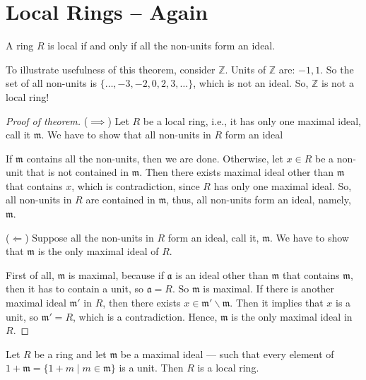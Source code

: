 \section{Local Rings -- Again}
\begin{theorem}
    A ring \(R\) is local if and only if all the non-units form an ideal. 
\end{theorem}
To illustrate usefulness of this theorem, consider \(\mathbb{Z}\). Units of \(\mathbb{Z}\) are: \(-1, 1\). So the set of all non-units is  \(\{\ldots, -3, -2, 0, 2, 3, \ldots\}\), which is not an ideal. So, \(\mathbb{Z}\) is not a local ring!
\begin{proof}[Proof of theorem]
    (\( \implies \)) Let \( R \) be a local ring, i.e., it has only one maximal ideal, call it \( \mathfrak{m} \). We have to show that all non-units in  \( R \) form an ideal

    If \( \mathfrak{m} \) contains all the non-units, then we are done. Otherwise, let \( x \in R \) be a non-unit that is not contained in  \( \mathfrak{m} \). Then there exists maximal ideal other than \( \mathfrak{m} \) that contains \( x \), which is contradiction, since  \( R \) has only one maximal ideal. So, all non-units in \( R \) are contained in \( \mathfrak{m} \), thus, all non-units form an ideal, namely, \( \mathfrak{m} \).

    (\( \Longleftarrow \)) Suppose all the non-units in \( R \) form an ideal, call it, \( \mathfrak{m} \). We have to show that \( \mathfrak{m} \) is the only maximal ideal of \( R \).

    First of all, \( \mathfrak{m} \) is maximal, because if \( \mathfrak{a} \) is an ideal other than \( \mathfrak{m} \) that contains  \( \mathfrak{m} \), then it has to contain a unit, so  \(  \mathfrak{a} = R \). So \( \mathfrak{m} \) is maximal. If there is another maximal ideal \( \mathfrak{m'} \) in \( R \), then there exists \( x \in \mathfrak{m'} \smallsetminus \mathfrak{m} \). Then it implies that \( x \) is a unit, so  \( \mathfrak{m'} = R\), which is a contradiction. Hence, \( \mathfrak{m} \) is the only maximal ideal in \( R \).
\end{proof}
\begin{theorem}
    Let \(R\) be a ring and let  \(\mathfrak{m}\) be a maximal ideal --- such that every element of \(1 + \mathfrak{m} = \{1 + m  \mid  m \in \mathfrak{m}\} \) is a unit. Then \(R\) is a local ring. 
\end{theorem}
